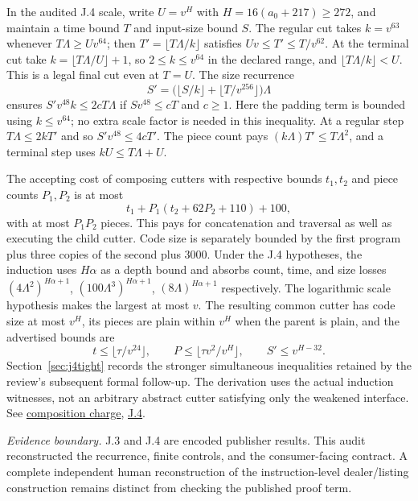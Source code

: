 \documentclass[11pt,letterpaper]{article}
\theoremstyle{definition}\newtheorem{definition}[theorem]{Definition}\newtheorem{example}[theorem]{Example}
\theoremstyle{remark}\newtheorem{remark}[theorem]{Remark}
\newcommand{\pub}[3]{\href{https://github.com/anthropics/formal-math/blob/11b6c7e3c927df2658f513b6b68ea7f8929c62c5/vp-vnp/#1\#L#2}{#3}}
\newcommand{\scope}[1]{\par\smallskip\noindent\textit{Evidence boundary.} #1\par\smallskip}
\begin{document}
In the audited J.4 scale, write $U=v^H$ with $H=16(a_0+217)\ge272$, and maintain a time bound $T$ and input-size bound $S$. The regular cut takes $k=v^{63}$ whenever $T\Lambda\ge Uv^{64}$; then $T'=\lfloor T\Lambda/k\rfloor$ satisfies $Uv\le T'\le T/v^{62}$. At the terminal cut take $k=\lfloor T\Lambda/U\rfloor+1$, so $2\le k\le v^{64}$ in the declared range, and $\lfloor T\Lambda/k\rfloor<U$. This is a legal final cut even at $T=U$. The size recurrence
\[
 S'=\bigl(\lfloor S/k\rfloor+\lfloor T/v^{256}\rfloor\bigr)\Lambda
\]
ensures $S'v^{48}k\le2cT\Lambda$ if $Sv^{48}\le cT$ and $c\ge1$. Here the padding term is bounded using $k\le v^{64}$; no extra scale factor is needed in this inequality. At a regular step $T\Lambda\le2kT'$ and so $S'v^{48}\le4cT'$. The piece count pays $(k\Lambda)T'\le T\Lambda^2$, and a terminal step uses $kU\le T\Lambda+U$.

The accepting cost of composing cutters with respective bounds $t_1,t_2$ and piece counts $P_1,P_2$ is at most
\begin{equation}\label{eq:listcost}
 t_1+P_1(t_2+62P_2+110)+100,
\end{equation}
with at most $P_1P_2$ pieces. This pays for concatenation and traversal as well as executing the child cutter. Code size is separately bounded by the first program plus three copies of the second plus 3000. Under the J.4 hypotheses, the induction uses $H\alpha$ as a depth bound and absorbs count, time, and size losses $(4\Lambda^2)^{H\alpha+1}$, $(100\Lambda^3)^{H\alpha+1}$, $(8\Lambda)^{H\alpha+1}$ respectively. The logarithmic scale hypothesis makes the largest at most $v$. The resulting common cutter has code size at most $v^H$, its pieces are plain within $v^H$ when the parent is plain, and the advertised bounds are
\[
 t\le\lfloor\tau/v^{24}\rfloor,\qquad
 P\le\lfloor\tau v^2/v^H\rfloor,\qquad
 S'\le v^{H-32}.
\]
Section~\ref{sec:j4tight} records the stronger simultaneous inequalities retained by the review's subsequent formal follow-up. The derivation uses the actual induction witnesses, not an arbitrary abstract cutter satisfying only the weakened interface. See \pub{NS1/Compose.lean}{89}{composition charge}, \pub{Paper/Cuts.lean}{460}{J.4}.

\scope{J.3 and J.4 are encoded publisher results. This audit reconstructed the recurrence, finite controls, and the consumer-facing contract. A complete independent human reconstruction of the instruction-level dealer/listing construction remains distinct from checking the published proof term.}
\end{document}
